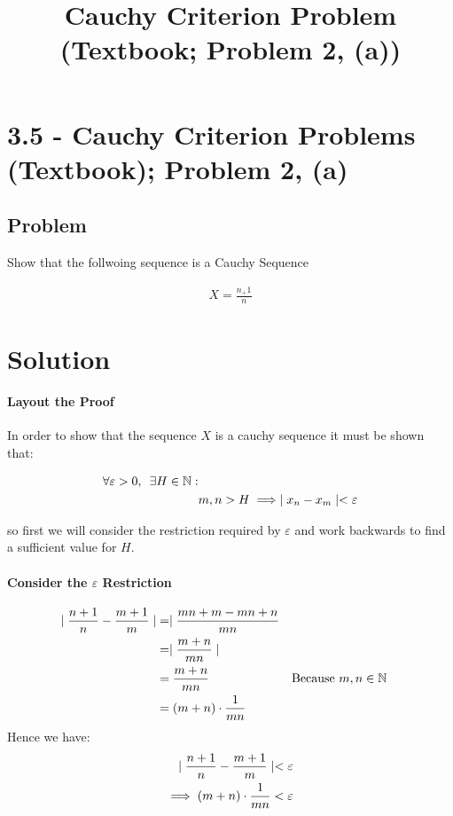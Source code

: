 \documentclass[class=article, crop=false]{standalone}
\title{Cauchy Criterion Problem (Textbook; Problem 2, (a))}
\begin{document}
\section{3.5 - Cauchy Criterion Problems (Textbook); Problem 2, (a)}
\subsection{Problem}
Show that the follwoing sequence is a Cauchy Sequence

\begin{align}
X = \frac{n_+1}{n}
  \label{inprob}
\end{align}


\section{Solution}
\paragraph{Layout the Proof}
In order to show that  the sequence $X$ is a cauchy sequence it must be shown that:

\begin{align}
  \forall \varepsilon > 0, \enspace \exists H\in \mathbb{N} :& \notag \\
  &m,n > H \implies \mid x_{n} - x_{m} \mid < \varepsilon
  \label{cauchdef}
\end{align}

so first we will consider the restriction required by $\varepsilon$ and work backwards to find a sufficient value for $H$.

\paragraph{Consider the $\varepsilon$ Restriction}
\begin{align}
  \mid \frac{n+1}{n} - \frac{m+1}{m} \mid &= \mid \frac{mn+m-mn+n}{mn} \notag \\
  &= \mid \frac{m+n}{mn} \mid \notag \\
  & = \frac{m+n}{mn} && \text{Because $m,n \in \mathbb{N}$} \notag \\
  &= \left( m+n \right) \cdot \frac{1}{mn}
  \label{finalform}
\end{align}
Hence we have:
\begin{align}
  \mid \frac{n+1}{n} - \frac{m+1}{m} \mid < \varepsilon \notag \\
  \implies  \left( m+n \right) \cdot \frac{1}{mn} < \varepsilon
  \label{epsrestfin}
\end{align}
\end{document}
